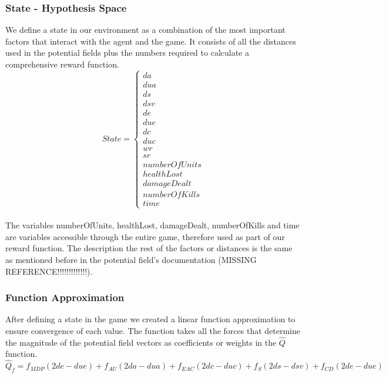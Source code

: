 \subsubsection{State - Hypothesis Space}

We define a state in our environment as a combination of the most important factors that interact with the agent and the game. It consists of all the distances used in the potential fields plus the numbers required to calculate a comprehensive reward function. \\
\begin{displaymath}
                       State = \begin{cases}
                         da \\  dua \\  ds \\  dsv \\ de \\ due \\ dc \\ duc \\ wr \\ sr \\ numberOfUnits \\ healthLost \\ damageDealt \\ numberOfKills \\ time
                      \end{cases}
\end{displaymath}\\

The variables numberOfUnits, healthLost, damageDealt, numberOfKills and time are variables accessible through the entire game, therefore used as part of our reward function. The description the rest of the factors or distances is the same as mentioned before in the potential field's documentation (MISSING REFERENCE!!!!!!!!!!!!!). 

\subsubsection{Function Approximation}

After defining a state in the game we created a linear function approximation to ensure convergence of each value. The function takes all the forces that determine the magnitude of the potential field vectors as coefficients or weights in the $\hat{Q}$ function. \\ 

\begin{equation}
\hat{Q}_f = f_{MDP} (2de - due) + f_{AU} (2da - dua) + f_{EAC} (2dc - duc) + f_{S}  (2ds - dsv) + f_{CD} (2de - due) 
\end{equation}


